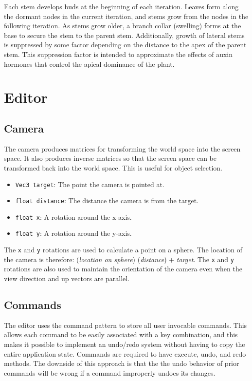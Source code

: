 \documentclass[10pt]{article}
\begin{document}
Each stem develops buds at the beginning of each iteration. Leaves form along the dormant nodes in the current iteration, and stems grow from the nodes in the following iteration. As stems grow older, a branch collar (swelling) forms at the base to secure the stem to the parent stem. Additionally, growth of lateral stems is suppressed by some factor depending on the distance to the apex of the parent stem. This suppression factor is intended to approximate the effects of auxin hormones that control the apical dominance of the plant.

\section{Editor}

\subsection{Camera}

The camera produces matrices for transforming the world space into the screen space. It also produces inverse matrices so that the screen space can be transformed back into the world space. This is useful for object selection.
\begin{itemize}
\item \texttt{Vec3 target}: The point the camera is pointed at.
\item \texttt{float distance}: The distance the camera is from the target.
\item \texttt{float x}: A rotation around the x-axis.
\item \texttt{float y}: A rotation around the y-axis.
\end{itemize}

The \texttt{x} and \texttt{y} rotations are used to calculate a point on a sphere. The location of the camera is therefore: (\textit{location on sphere}) (\textit{distance}) + \textit{target}. The \texttt{x} and \texttt{y} rotations are also used to maintain the orientation of the camera even when the view direction and up vectors are parallel.

\subsection{Commands}

The editor uses the command pattern to store all user invocable commands. This allows each command to be easily associated with a key combination, and this makes it possible to implement an undo/redo system without having to copy the entire application state. Commands are required to have execute, undo, and redo methods. The downside of this approach is that the the undo behavior of prior commands will be wrong if a command improperly undoes its changes.
\end{document}
